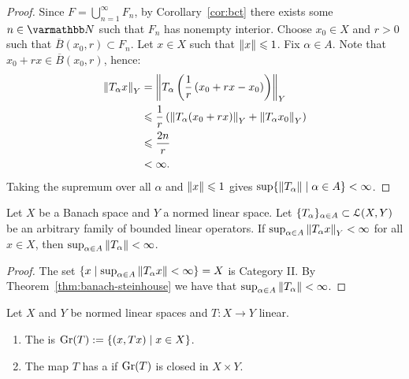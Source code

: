 \begin{proof}
        Since $F = \bigcup_{n = 1}^\infty F_n$, by Corollary~\ref{cor:bct} there exists some $n \in \bfN$ such that $F_n$ has nonempty interior. Choose $x_0 \in X$ and $r > 0$ such that $\overline{B}(x_0,r) \subset F_n$. Let $x \in X$ such that $\left\lVert x \right\rVert \leqslant 1$. Fix $\alpha \in A$. Note that $x_0 + rx \in \overline{B}(x_0,r)$, hence:
            \begin{equation*}
            \begin{split}
                \left\lVert T_\alpha x \right\rVert_Y 
                & = \left\lVert T_\alpha \left( \frac{1}{r}\left( x_0 + rx - x_0 \right) \right) \right\rVert_Y \\
                & \leqslant \frac{1}{r} \left( \left\lVert T_\alpha(x_0 + rx) \right\rVert_Y + \left\lVert T_\alpha x_0 \right\rVert_Y \right) \\
                & \leqslant \frac{2n}{r} \\
                & < \infty.
            \end{split}
            \end{equation*}
        Taking the supremum over all $\alpha$ and $\left\lVert x \right\rVert \leqslant 1$ gives $\sup\{ \left\lVert T_\alpha \right\rVert \mid \alpha \in A\} < \infty$.
    \end{proof}

\begin{corollary}
    Let $X$ be a Banach space and $Y$ a normed linear space. Let $\{T_\alpha\}_{\alpha \in A} \subset \mathcal{L}(X,Y)$ be an arbitrary family of bounded linear operators. If $\sup_{\alpha \in A}\left\lVert T_\alpha x \right\rVert_Y < \infty$ for all $x \in X$, then $\sup_{\alpha \in A}\left\lVert T_\alpha \right\rVert < \infty$.
\end{corollary}
    \begin{proof}
       The set $\{x \mid \sup_{\alpha \in A}\left\lVert T_\alpha x \right\rVert <\infty \} = X$ is Category II. By Theorem~\ref{thm:banach-steinhouse} we have that $\sup_{\alpha \in A}\left\lVert T_\alpha \right\rVert < \infty$.
    \end{proof}

\begin{definition}
    Let $X$ and $Y$ be normed linear spaces and $T:X \rightarrow Y$ linear.
    \begin{enumerate}[label = (\arabic*),itemsep=1pt,topsep=3pt]
        \item The  is $\operatorname{Gr}(T) := \{(x,Tx) \mid x \in X\}$.
        \item The map $T$ has a  if $\operatorname{Gr}(T)$ is closed in $X \times Y$.
    \end{enumerate}
\end{definition}

